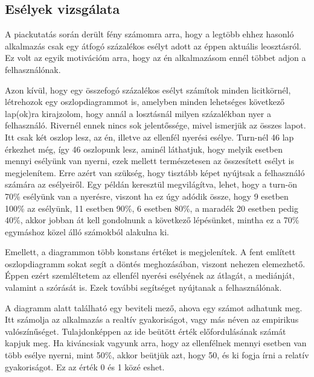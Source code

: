 \subsection{Esélyek vizsgálata}
A piackutatás során derült fény számomra arra, hogy a legtöbb ehhez hasonló alkalmazás csak egy átfogó százalékos esélyt adott az éppen aktuális leosztásról. Ez volt az egyik motivációm arra, hogy az én alkalmazásom ennél többet adjon a felhasználónak.

Azon kívül, hogy egy összefogó százalékos esélyt számítok minden licitkörnél, létrehozok egy oszlopdiagrammot is, amelyben minden lehetséges következő lap(ok)ra kirajzolom, hogy annál a losztásnál milyen százalékban nyer a felhasználó. Rivernél ennek nincs sok jelentőssége, mivel ismerjük az összes lapot. Itt csak két oszlop lesz, az én, illetve az ellenfél nyerési esélye. Turn-nél 46 lap érkezhet még, így 46 oszlopunk lesz, aminél láthatjuk, hogy melyik esetben mennyi esélyünk van nyerni, ezek mellett természetesen az összesített esélyt is megjelenítem. Erre azért van szükség, hogy tisztább képet nyújtsak a felhasználó számára az esélyeiről. Egy példán keresztül megvilágítva, lehet, hogy a turn-ön 70\% esélyünk van a nyerésre, viszont ha ez úgy adódik össze, hogy 9 esetben 100\% az esélyünk, 11 esetben 90\%, 6 esetben 80\%, a maradék 20 esetben pedig 40\%, akkor jobban át kell gondolnunk a következő lépésünket, mintha ez a 70\% egymáshoz közel álló számokból alakulna ki.

Emellett, a diagrammon több konstans értéket is megjelenítek. A fent említett oszlopdiagramm sokat segít a döntés meghozásában, viszont nehezen elemezhető. Éppen ezért szemléltetem az ellenfél nyerési esélyének az átlagát, a mediánját, valamint a szórását is. Ezek további segítséget nyújtanak a felhasználónak.

A diagramm alatt található egy beviteli mező, ahova egy számot adhatunk meg. Itt számolja az alkalmazás a realtív gyakoriságot, vagy más néven az empirikus valószínűséget. Tulajdonképpen az ide beütött érték előfordulásának számát kapjuk meg. Ha kiváncsiak vagyunk arra, hogy az ellenfélnek mennyi esetben van több esélye nyerni, mint 50\%, akkor beütjük azt, hogy 50, és ki fogja írni a relatív gyakoriságot. Ez az érték 0 és 1 közé eshet.